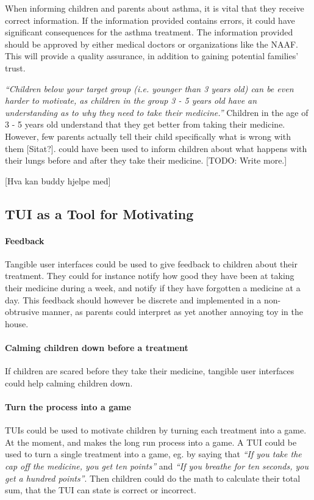 When informing children and parents about asthma, it is vital that they receive correct information. If the information provided contains errors, it could have significant consequences for the asthma treatment. The information provided should be approved by either medical doctors or organizations like the NAAF. This will provide a quality assurance, in addition to gaining potential families' trust.    

\textit{``Children below your target group (i.e. younger than 3 years old) can be even harder to motivate, as children in the group 3 - 5 years old have an understanding as to why they need to take their medicine.''}
Children in the age of 3 - 5 years old understand that they get better from taking their medicine. However, few parents actually tell their child specifically what is wrong with them [Sitat?]. \buddy{} could have been used to inform children about what happens with their lungs before and after they take their medicine. 
[TODO: Write more.] 

[Hva kan buddy hjelpe med]

\subsection{TUI as a Tool for Motivating}
\label{sec:tuiasatoolformotivating}

\paragraph{Feedback}
Tangible user interfaces could be used to give feedback to children about their treatment. They could for instance notify how good they have been at taking their medicine during a week, and notify if they have forgotten a medicine at a day. This feedback should however be discrete and implemented in a non-obtrusive manner, as parents could interpret \ab{} as yet another annoying toy in the house.   

\paragraph{Calming children down before a treatment}
If children are scared before they take their medicine, tangible user interfaces could help calming children down. 

\paragraph{Turn the process into a game}
TUIs could be used to motivate children by turning each treatment into a game. At the moment, \ab{} and \app{} makes the long run process into a game. A TUI could be used to turn a single treatment into a game, eg. by saying that \textit{``If you take the cap off the medicine, you get ten points''} and \textit{``If you breathe for ten seconds, you get a hundred points''}. Then children could do the math to calculate their total sum, that the TUI can state is correct or incorrect. 

